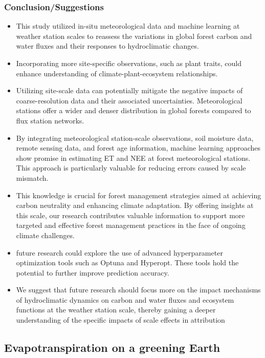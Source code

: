 \documentclass[paper=a4, fontsize=12pt]{scrartcl}
\begin{document}
	\subsubsection*{Conclusion/Suggestions}
	\begin{itemize}
		\item This study utilized in-situ meteorological data and machine learning at weather station scales to reassess the variations in global forest carbon and water fluxes and their responses to hydroclimatic changes.
		\item Incorporating more site-specific observations, such as plant traits, could enhance understanding of climate-plant-ecosystem relationships.
		\item Utilizing site-scale data can potentially mitigate the negative impacts of coarse-resolution data and their associated uncertainties. Meteorological stations offer a wider and denser distribution in global forests compared to flux station networks. 
		\item By integrating meteorological station-scale observations, soil moisture data, remote  sensing data, and forest age information, machine learning approaches show promise in estimating ET and NEE at forest meteorological stations. This approach is particularly valuable for reducing errors caused by scale mismatch.
		\item This knowledge is crucial for forest management strategies aimed at achieving carbon neutrality and enhancing climate adaptation. By offering insights at this scale, our research contributes valuable information to support more targeted and effective forest management practices in the face of ongoing climate challenges.
		\item future research could explore the use of advanced hyperparameter optimization tools such as Optuna and Hyperopt. These tools hold the potential to further improve prediction accuracy.
		\item We suggest that future research should focus more on the impact mechanisms of hydroclimatic dynamics on carbon and water fluxes and ecosystem functions at the weather station scale, thereby gaining a deeper understanding of the specific impacts of scale effects in attribution
	\end{itemize}
	
	
	
	\subsection{Evapotranspiration on a greening Earth \citep{yang2023evapotranspiration}}
\end{document}
